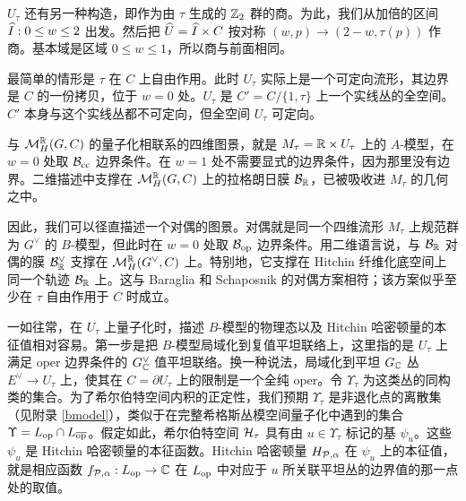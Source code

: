 $U_\tau$ 还有另一种构造，即作为由 $\tau$ 生成的 $\Z_2$ 群的商。为此，我们从加倍的区间 $\h I: 0\leq w\leq 2$ 出发。然后把 $\h U= \h I\times C$ 按对称 $(w,p)\to (2-w,\tau(p))$ 作商。基本域是区域 $0\leq w\leq 1$，所以商与前面相同。

最简单的情形是 $\tau$ 在 $C$ 上自由作用。此时 $U_\tau$ 实际上是一个可定向流形，其边界是 $C$ 的一份拷贝，位于 $w=0$ 处。$U_\tau$ 是 $C'=C/\{1,\tau\}$ 上一个实线丛的全空间。$C'$ 本身与这个实线丛都不可定向，但全空间 $U_\tau$ 可定向。

与 $\M_H^\R(G,C)$ 的量子化相联系的四维图景，就是 $M_\tau=\R\times U_\tau$ 上的 $A$-模型，在 $w=0$ 处取 $\B_\cc$ 边界条件。在 $w=1$ 处不需要显式的边界条件，因为那里没有边界。二维描述中支撑在 $\M_H^\R(G,C)$ 上的拉格朗日膜 $\B_\R$，已被吸收进 $M_\tau$ 的几何之中。

因此，我们可以径直描述一个对偶的图景。对偶就是同一个四维流形 $M_\tau$ 上规范群为 $G^\vee$ 的 $B$-模型，但此时在 $w=0$ 处取 $\B_\op$ 边界条件。用二维语言说，与 $\B_\R$ 对偶的膜 $\B^\vee_\R$ 支撑在 $\M_H^\R(G^\vee,C)$ 上。特别地，它支撑在 Hitchin 纤维化底空间上同一个轨迹 ${\cB}_\R$ 上。这与 Baraglia 和 Schaposnik \cite{BaSc} 的对偶方案相符；该方案似乎至少在 $\tau$ 自由作用于 $C$ 时成立。

一如往常，在 $U_\tau$ 上量子化时，描述 $B$-模型的物理态以及 Hitchin 哈密顿量的本征值相对容易。第一步是把 $B$-模型局域化到复值平坦联络上，这里指的是 $U_\tau$ 上满足 oper 边界条件的 $G^\vee_\C$ 值平坦联络。换一种说法，局域化到平坦 $G_\C$ 丛 $E^\vee\to U_\tau$ 上，使其在 $C=\partial U_\tau$ 上的限制是一个全纯 oper。令 $\Upsilon_\tau$ 为这类丛的同构类的集合。为了希尔伯特空间内积的正定性，我们预期 $\Upsilon_\tau$ 是非退化点的离散集（见附录 \ref{bmodel}），类似于在完整希格斯丛模空间量子化中遇到的集合 $\Upsilon=L_\op\cap L_\bop$。假定如此，希尔伯特空间 $\H_\tau$ 具有由 $u\in \Upsilon_\tau$ 标记的基 $\psi_u$。这些 $\psi_u$ 是 Hitchin 哈密顿量的本征函数。Hitchin 哈密顿量 $H_{\P,\alpha}$ 在 $\psi_u$ 上的本征值，就是相应函数 $f_{\P,\alpha}:L_\op\to \C$ 在 $L_\op$ 中对应于 $u$ 所关联平坦丛的边界值的那一点处的取值。

